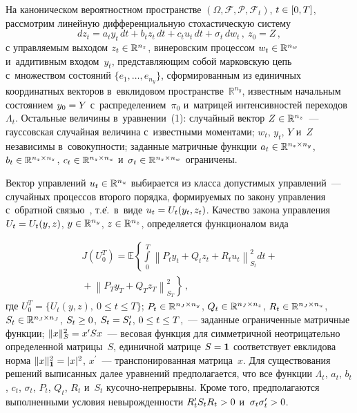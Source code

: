 \begin{multicols}{2}
     На каноническом вероятностном пространстве $(\Omega, \mathcal{F}, 
\mathcal{P}, \mathcal{F}_t)$, $t\hm\in [0,T]$, рассмотрим линейную 
дифференциальную стохастическую систему
     \begin{equation}
     dz_t= a_t y_t \,dt+ b_t z_t \,dt+ c_t u_t \,dt+ \sigma_t\, dw_t\,,\ 
     z_0=Z\,,
     \label{e1-bos}
     \end{equation}
с управляемым выходом $z_t\hm\in \mathbb{R}^{n_z}$, винеровским 
процессом $w_t\hm\in \mathbb{R}^{n_w}$ и~аддитивным входом~$y_t$, 
представляющим собой марковскую цепь с~множеством состояний $\{e_1, 
\ldots , e_{n_y}\}$, сформированным из единичных координатных векторов 
в~евклидовом пространстве~$\mathbb{R}^{n_y}$, известным начальным 
состоянием $y_0\hm= {Y}$ с~распределением~$\pi_0$ и~матрицей 
интенсивностей переходов~$\Lambda_t$. Остальные величины 
в~уравнении~(1): случайный вектор $Z\hm\in \mathbb{R}^{n_z}$~--- 
гауссовская случайная величина с~известными моментами; $w_t$, $y_t$, $Y$ 
и~$Z$ независимы в~совокупности; заданные матричные функции $a_t\hm\in 
\mathbb{R}^{n_z\times n_y}$, $b_t\hm\in \mathbb{R}^{n_z\times n_z}$, 
$c_t\hm\in \mathbb{R}^{n_z\times n_u}$ и~$\sigma_t\hm\in 
\mathbb{R}^{n_z\times n_w}$ ограничены.
     
     Вектор управлений $u_t\hm\in \mathbb{R}^{n_u}$ выбирается из класса 
допустимых управлений~--- случайных процессов второго порядка, 
формируемых по закону управления с~обратной связью~\cite{6-bos}, т.\.е.\ 
в~виде $u_t\hm= U_t(y_t, z_t)$. Качество закона управления $U_t\hm= 
U_t(y,z)$, $y\hm\in \mathbb{R}^{n_y}$, $z\hm\in \mathbb{R}^{n_z}$, 
определяется функционалом вида

\noindent
     \begin{multline}
     J(U_0^T) =\mathbb{E}\left\{ 
     \int\limits_0^T \left\| P_t y_t +Q_t z_t +R_t u_t\right\|^2_{S_t} dt +{}\right.\\
\left.     {}+\left\| 
P_T y_T+ Q_T z_T\right\|^2_{S_T}\right\}\,,
     \label{e2-bos}
     \end{multline}
где $U_0^T=\{ U_t(y,z),\ 0\leq t\leq T\}$; $P_t\hm\in \mathbb{R}^{n_J\times 
n_y}$, $Q_t\hm\in \mathbb{R}^{n_J\times n_z}$, $R_t\hm\in 
\mathbb{R}^{n_J\times n_u}$, $S_t\hm\in \mathbb{R}^{n_J\times n_J}$,  
$S_t\hm\geq 0$, $S_t\hm= S_t^\prime$, $0\hm\leq t\hm\leq T$,~--- заданные 
ограниченные матричные функции; $\| x\|_S^2\hm= x^\prime S x$~--- весовая 
функция для симметричной неотрицательно определенной матрицы~$S$, 
единичной матрице $S\hm=\mathbf{1}$ соответствует евклидова норма $\| 
x\|^2_{\mathbf{1}}\hm= \vert x\vert^2$, $x^\prime$~--- транспонированная 
матрица~$x$. Для существования решений выписанных далее уравнений 
предполагается, что все функции $\Lambda_t$, $a_t$, $b_t$, $c_t$, $\sigma_t$, 
$P_t$, $Q_t$, $R_t$ и~$S_t$ ку\-соч\-но-не\-пре\-рыв\-ны. Кроме того, 
предполагаются выполненными условия невырожденности $R^\prime_t S_t 
R_t \hm>0$ и~$\sigma_t \sigma_t^\prime \hm>0$.
     

\end{multicols}
